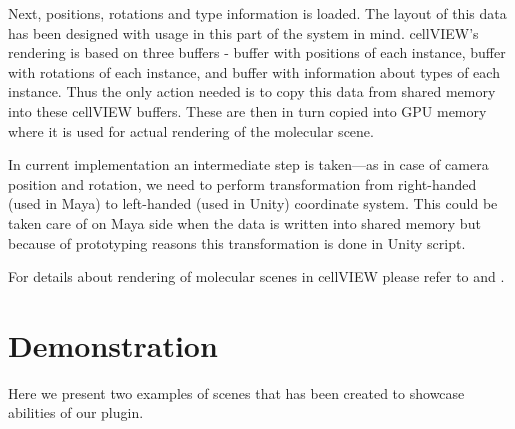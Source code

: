 \documentclass[
  digital, %
  table,   %
  nolof,     %
  nolot,     %
]{fithesis3}
\begin{document}
Next, positions, rotations and type information is loaded. The layout of this data has been designed with usage in this part of the system in mind. cellVIEW's rendering is based on three buffers - buffer with positions of each instance, buffer with rotations of each instance, and buffer with information about types of each instance. Thus the only action needed is to copy this data from shared memory into these cellVIEW buffers. These are then in turn copied into GPU memory where it is used for actual rendering of the molecular scene.

In current implementation an intermediate step is taken—as in case of camera position and rotation, we need to perform transformation from right-handed (used in Maya) to left-handed (used in Unity) coordinate system. This could be taken care of on Maya side when the data is written into shared memory but because of prototyping reasons this transformation is done in Unity script.

For details about rendering of molecular scenes in cellVIEW please refer to \cite{lemuzic-2014-ivm} and \cite{cellVIEW_2015}.

\chapter{Demonstration}
Here we present two examples of scenes that has been created to showcase abilities of our plugin.
\end{document}

